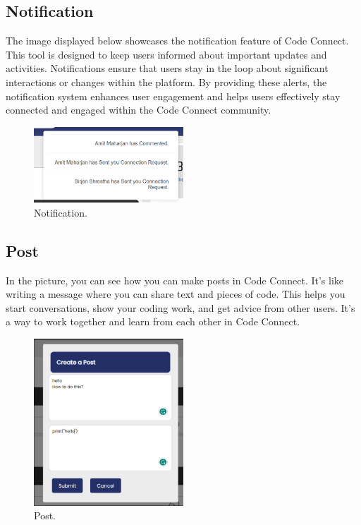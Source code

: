 \subsection{Notification}
The image displayed below showcases the notification feature of Code Connect. This tool is designed to keep users informed about important updates and activities. Notifications ensure that users stay in the loop about significant interactions or changes within the platform. By providing these alerts, the notification system enhances user engagement and helps users effectively stay connected and engaged within the Code Connect community.
\begin{figure}[ht]
    \centering
    \includegraphics[width=0.5\textwidth]{Outcome-ss/notification.png}
    \caption{Notification.}
    \label{fig:Notification}
\end{figure}

\subsection{Post}
In the picture, you can see how you can make posts in Code Connect. It's like writing a message where you can share text and pieces of code. This helps you start conversations, show your coding work, and get advice from other users. It's a way to work together and learn from each other in Code Connect.
\begin{figure}[ht]
    \centering
    \includegraphics[width=0.5\textwidth]{Outcome-ss/post.png}
    \caption{Post.}
    \label{fig:Post}
\end{figure}

